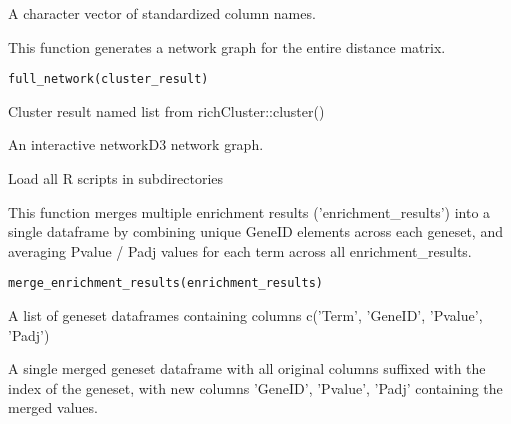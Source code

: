 \documentclass[a4paper]{book}
\begin{document}
%
\begin{Value}
A character vector of standardized column names.
\end{Value}
%
\begin{Description}
This function generates a network graph for the entire distance matrix.
\end{Description}
%
\begin{Usage}
\begin{verbatim}
full_network(cluster_result)
\end{verbatim}
\end{Usage}
%
\begin{Arguments}
\begin{ldescription}
\item[\code{cluster\_result}] Cluster result named list from richCluster::cluster()
\end{ldescription}
\end{Arguments}
%
\begin{Value}
An interactive networkD3 network graph.
\end{Value}
%
\begin{Description}
Load all R scripts in subdirectories
\end{Description}
%
\begin{Description}
This function merges multiple enrichment results ('enrichment\_results') into a single dataframe by
combining unique GeneID elements across each geneset, and averaging Pvalue / Padj
values for each term across all enrichment\_results.
\end{Description}
%
\begin{Usage}
\begin{verbatim}
merge_enrichment_results(enrichment_results)
\end{verbatim}
\end{Usage}
%
\begin{Arguments}
\begin{ldescription}
\item[\code{enrichment\_results}] A list of geneset dataframes containing columns c('Term', 'GeneID', 'Pvalue', 'Padj')
\end{ldescription}
\end{Arguments}
%
\begin{Value}
A single merged geneset dataframe with all original columns
suffixed with the index of the geneset, with new columns 'GeneID', 'Pvalue',
'Padj' containing the merged values.
\end{Value}
\end{document}
